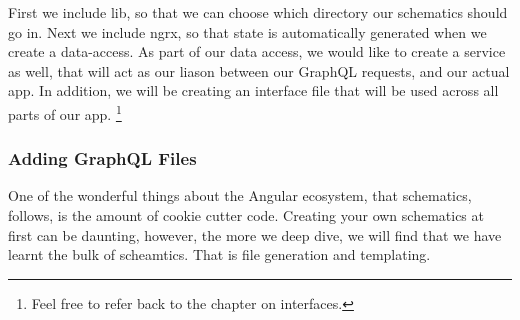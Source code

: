 First we include lib, so that we can choose which directory our schematics
should go in. Next we include ngrx, so that state is automatically generated
when we create a data-access. As part of our data access, we would like to
create a service as well, that will act as our liason between our GraphQL
requests, and our actual app. In addition, we will be creating an interface
file that will be used across all parts of our app. \footnote{Feel free to refer
back to the chapter on interfaces.}

\subsubsection{ Adding GraphQL Files }
One of the wonderful things about the Angular ecosystem, that schematics,
follows, is the amount of cookie cutter code. Creating your own schematics at
first can be daunting, however, the more we deep dive, we will find that we have
learnt the bulk of scheamtics. That is file generation and templating.
